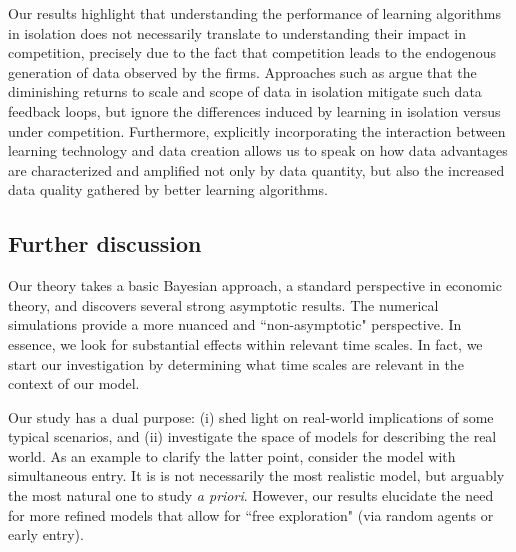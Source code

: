 Our results highlight that understanding the performance of learning algorithms in isolation does not necessarily translate to understanding their impact in competition, precisely due to the fact that competition leads to the endogenous generation of data observed by the firms. Approaches such as \citet{lambrecht2015can, bajari2018impact, varian2018artificial} argue that the diminishing returns to scale and scope of data in isolation mitigate such data feedback loops,
but ignore the differences induced by learning in isolation versus under competition. Furthermore, explicitly incorporating the interaction between learning technology and data creation allows us to speak on how data advantages are characterized and amplified not only by data quantity, but also the increased data quality gathered by better learning algorithms.




\subsection{Further discussion}
\label{sec:discussion}

Our theory takes a basic Bayesian approach, a standard perspective in economic theory, and discovers several strong asymptotic results. The numerical simulations provide a more nuanced and ``non-asymptotic" perspective. In essence, we look for substantial effects within relevant time scales. In fact, we start our investigation by determining what time scales are relevant in the context of our model.


Our study has a dual purpose: (i) shed light on real-world implications of some typical scenarios, and (ii) investigate the space of models for describing the real world. As an example to clarify the latter point, consider the \HardMax model with simultaneous entry. It is is not necessarily the most realistic model, but arguably the most natural one to study \emph{a priori}. However, our results elucidate the need for more refined models that allow for ``free exploration" (\eg via random agents or early entry).

